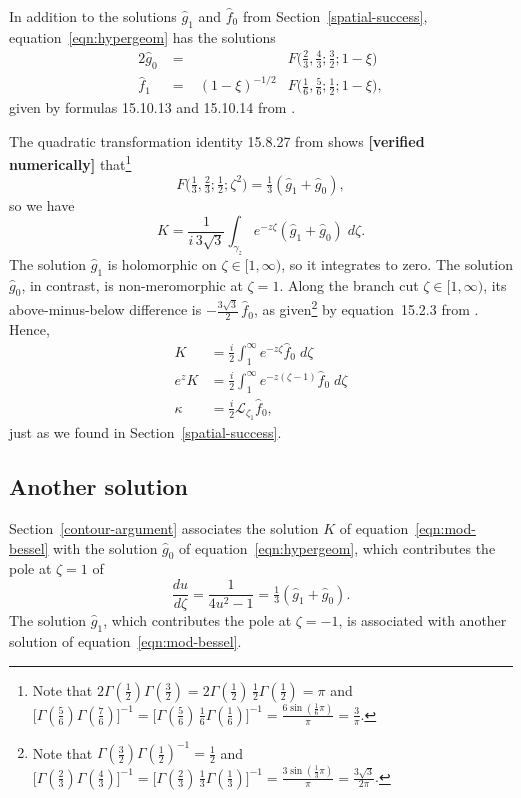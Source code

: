 \documentclass{article}
\newcommand{\laplace}{\mathcal{L}}
\begin{document}
In addition to the solutions $\hat{g}_1$ and $\hat{f}_0$ from Section~\ref{spatial-success}, equation~\ref{eqn:hypergeom} has the solutions
\begin{alignat*}{2}
\hat{g}_0 &\;=\;& & F\big(\tfrac{2}{3}, \tfrac{4}{3}; \tfrac{3}{2}; 1-\xi\big) \\
\hat{f}_1 &\;=\;& (1-\xi)^{-1/2} & F\big(\tfrac{1}{6}, \tfrac{5}{6}; \tfrac{1}{2}; 1-\xi\big),
\end{alignat*}
given by formulas 15.10.13 and 15.10.14 from \cite{dlmf}.

The quadratic transformation identity 15.8.27 from \cite{dlmf} shows \textbf{[verified numerically]} that\footnote{Note that $2\Gamma(\tfrac{1}{2})\Gamma(\tfrac{3}{2}) = 2\Gamma(\tfrac{1}{2})\,\tfrac{1}{2}\Gamma(\tfrac{1}{2}) = \pi$ and $\big[\Gamma(\tfrac{5}{6})\Gamma(\tfrac{7}{6})\big]^{-1} = \big[\Gamma(\tfrac{5}{6})\,\tfrac{1}{6}\Gamma(\tfrac{1}{6})\big]^{-1} = \frac{6\sin(\tfrac{1}{6} \pi)}{\pi} = \frac{3}{\pi}$.}
\[ F\big(\tfrac{1}{3}, \tfrac{2}{3}; \tfrac{1}{2}; \zeta^2\big) = \tfrac{1}{3}(\hat{g}_1 + \hat{g}_0), \]
so we have
\[ K = \frac{1}{i\,3\sqrt{3}} \int_{\gamma_z} e^{-z\zeta} (\hat{g}_1 + \hat{g}_0)\;d\zeta. \]
The solution $\hat{g}_1$ is holomorphic on $\zeta \in [1, \infty)$, so it integrates to zero. The solution $\hat{g}_0$, in contrast, is non-meromorphic at $\zeta = 1$. Along the branch cut $\zeta \in [1, \infty)$, its above-minus-below difference is $-\tfrac{3\sqrt{3}}{2}\,\hat{f}_0$,
as given\footnote{Note that $\Gamma(\tfrac{3}{2}) \Gamma(\tfrac{1}{2})^{-1} = \tfrac{1}{2}$ and $\big[\Gamma(\tfrac{2}{3})\Gamma(\tfrac{4}{3})\big]^{-1} = \big[\Gamma(\tfrac{2}{3})\,\tfrac{1}{3}\Gamma(\tfrac{1}{3})\big]^{-1} = \frac{3\sin(\tfrac{1}{3} \pi)}{\pi} = \frac{3\sqrt{3}}{2\pi}$.} by equation~15.2.3 from \cite{dlmf}.
Hence,
\begin{align*}
K & = \frac{i}{2} \int^\infty_1 e^{-z\zeta} \hat{f}_0\;d\zeta \\
e^z K & = \frac{i}{2} \int^\infty_1 e^{-z(\zeta - 1)} \hat{f}_0\;d\zeta \\
\kappa & = \tfrac{i}{2} \laplace_{\zeta_1} \hat{f}_0,
\end{align*}
just as we found in Section~\ref{spatial-success}.
\subsection{Another solution}
Section~\ref{contour-argument} associates the solution $K$ of equation~\ref{eqn:mod-bessel} with the solution $\hat{g}_0$ of equation~\ref{eqn:hypergeom}, which contributes the pole at $\zeta = 1$ of
\[ \frac{du}{d\zeta} = \frac{1}{4u^2 - 1} = \tfrac{1}{3}(\hat{g}_1 + \hat{g}_0). \]
The solution $\hat{g}_1$, which contributes the pole at $\zeta = -1$, is associated with another solution of equation~\ref{eqn:mod-bessel}.
\end{document}
